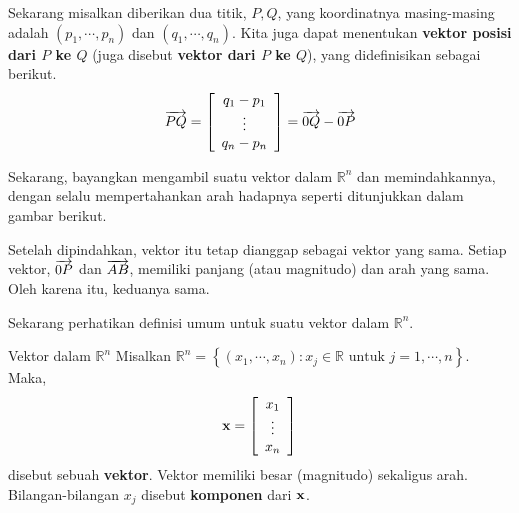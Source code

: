 Sekarang misalkan diberikan dua titik, $P,Q$, yang koordinatnya masing-masing adalah
$\left( p_{1},\cdots ,p_{n}\right) $ dan $\left(
q_{1},\cdots ,q_{n}\right) $. Kita juga dapat menentukan
\textbf{vektor posisi dari $P$ ke $Q$} (juga disebut \textbf{vektor dari $P$ ke $Q$}), yang didefinisikan sebagai berikut.
\begin{equation*}
\overrightarrow{PQ} = \left[ \begin{array}{c}
q_{1}-p_{1}\\
 \vdots \\
q_{n}-p_{n}
\end{array}
\right] = \overrightarrow{0Q} - \overrightarrow{0P}
\end{equation*}

Sekarang, bayangkan mengambil suatu vektor dalam $\mathbb{R}^n$ dan memindahkannya, dengan selalu
mempertahankan arah hadapnya seperti ditunjukkan dalam gambar berikut.

\begin{center}
\par{}\label{fig:RnVectorsRn-tikz03}%

\end{center}

Setelah dipindahkan, vektor itu tetap dianggap sebagai vektor yang sama. Setiap vektor, $\overrightarrow{0P}$ dan $\overrightarrow{AB}$, memiliki panjang (atau magnitudo) dan arah yang sama. Oleh karena itu, keduanya sama.

Sekarang perhatikan definisi umum untuk suatu vektor dalam $\mathbb{R}^n$.

\begin{definition}{Vektor dalam $\mathbb{R}^n$}\label{def:vectorsRn}
Misalkan $\mathbb{R}^{n} = \left\{ \left( x_{1}, \cdots, x_{n}\right)
:x_{j}\in \mathbb{R}\text{ untuk }j=1,\cdots ,n\right\} .$ Maka,
\begin{equation*}
\mathbf{x}
=
\left[ \begin{array}{c}
x_{1} \\
\vdots \\
x_{n}
\end{array}
\right]
\end{equation*}
disebut sebuah \textbf{vektor}. Vektor memiliki besar (magnitudo) sekaligus arah.
Bilangan-bilangan $x_{j}$ disebut \textbf{komponen} dari $\mathbf{x}$.
\end{definition}

